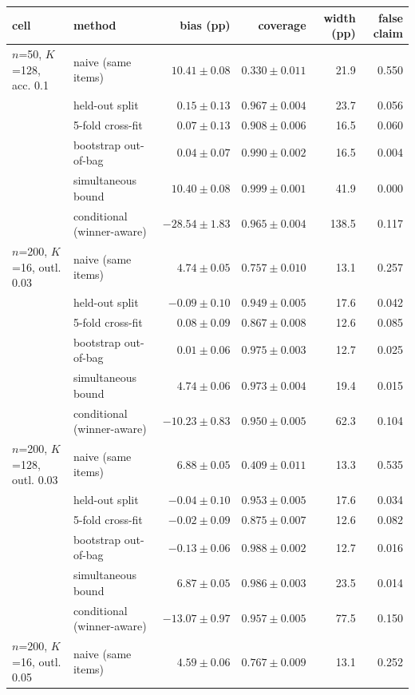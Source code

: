 {\footnotesize\setlength{\tabcolsep}{3.5pt}
\begin{tabular}{llrrrr}
\toprule
cell & method & bias (pp) & coverage & width (pp) & false claim \\
\midrule
$n$=50, $K$=128, acc. 0.1 & naive (same items) & $10.41 \pm 0.08$ & $0.330 \pm 0.011$ & 21.9 & 0.550 \\
 & held-out split & $0.15 \pm 0.13$ & $0.967 \pm 0.004$ & 23.7 & 0.056 \\
 & 5-fold cross-fit & $0.07 \pm 0.13$ & $0.908 \pm 0.006$ & 16.5 & 0.060 \\
 & bootstrap out-of-bag & $0.04 \pm 0.07$ & $0.990 \pm 0.002$ & 16.5 & 0.004 \\
 & simultaneous bound & $10.40 \pm 0.08$ & $0.999 \pm 0.001$ & 41.9 & 0.000 \\
 & conditional (winner-aware) & $-28.54 \pm 1.83$ & $0.965 \pm 0.004$ & 138.5 & 0.117 \\
\midrule
$n$=200, $K$=16, outl. 0.03 & naive (same items) & $4.74 \pm 0.05$ & $0.757 \pm 0.010$ & 13.1 & 0.257 \\
 & held-out split & $-0.09 \pm 0.10$ & $0.949 \pm 0.005$ & 17.6 & 0.042 \\
 & 5-fold cross-fit & $0.08 \pm 0.09$ & $0.867 \pm 0.008$ & 12.6 & 0.085 \\
 & bootstrap out-of-bag & $0.01 \pm 0.06$ & $0.975 \pm 0.003$ & 12.7 & 0.025 \\
 & simultaneous bound & $4.74 \pm 0.06$ & $0.973 \pm 0.004$ & 19.4 & 0.015 \\
 & conditional (winner-aware) & $-10.23 \pm 0.83$ & $0.950 \pm 0.005$ & 62.3 & 0.104 \\
\midrule
$n$=200, $K$=128, outl. 0.03 & naive (same items) & $6.88 \pm 0.05$ & $0.409 \pm 0.011$ & 13.3 & 0.535 \\
 & held-out split & $-0.04 \pm 0.10$ & $0.953 \pm 0.005$ & 17.6 & 0.034 \\
 & 5-fold cross-fit & $-0.02 \pm 0.09$ & $0.875 \pm 0.007$ & 12.6 & 0.082 \\
 & bootstrap out-of-bag & $-0.13 \pm 0.06$ & $0.988 \pm 0.002$ & 12.7 & 0.016 \\
 & simultaneous bound & $6.87 \pm 0.05$ & $0.986 \pm 0.003$ & 23.5 & 0.014 \\
 & conditional (winner-aware) & $-13.07 \pm 0.97$ & $0.957 \pm 0.005$ & 77.5 & 0.150 \\
\midrule
$n$=200, $K$=16, outl. 0.05 & naive (same items) & $4.59 \pm 0.06$ & $0.767 \pm 0.009$ & 13.1 & 0.252 \\

\end{tabular}}
